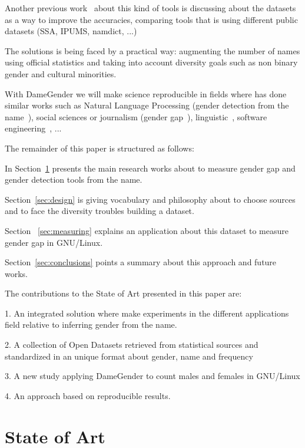 \documentclass[a4paper]{article}
\begin{document}
Another previous work~\cite{karimi2016inferring} about this kind of
tools is discussing about the datasets as a way to improve the
accuracies, comparing tools that is using different public datasets
(SSA, IPUMS, namdict, ...)

The solutions is being faced by a practical way: augmenting the number
of names using official statistics and taking into account diversity
goals such as non binary gender and cultural minorities.

With DameGender we will make science
reproducible\cite{peng2011reproducible} in fields where has done
similar works such as Natural Language Processing (gender detection
from the name~\cite{sun2019mitigating}), social sciences or journalism
(gender
gap~\cite{holman2018gender,mislove2011understanding,niemi2017gendered,de2014genero}),
linguistic~\cite{hutson2016gender,van2020gender,okal2018linguistic},
software engineering~\cite{vasilescu2012gender}, ...

The remainder of this paper is structured as follows:

In Section~\ref{sec:stateofart} presents the main research works about
to measure gender gap and gender detection tools from the name.

Section~\ref{sec:design} is giving vocabulary and philosophy about to
choose sources and to face the diversity troubles building a dataset.

Section ~\ref{sec:measuring} explains an application about this
dataset to measure gender gap in GNU/Linux.

Section~\ref{sec:conclusions} points a summary about this approach and
future works.

The contributions to the State of Art presented in this paper are:

1. An integrated solution where make experiments in the different
applications field relative to inferring gender from the name.

2. A collection of Open Datasets retrieved from statistical sources
and standardized in an unique format about gender, name and frequency

3. A new study applying DameGender to count males and females in
GNU/Linux

4. An approach based on reproducible results.


\section{State of Art}
\label{sec:stateofart}
\end{document}
